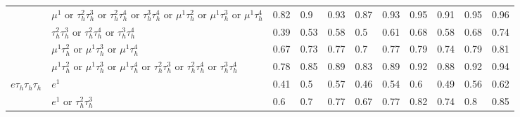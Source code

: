\begin{table}
{\begin{tabular}{|c|c|c||lllllllll}
\multicolumn{1}{|l|}{} & \multicolumn{2}{l||}{$\mu^{1}$ or $\tau_{h}^{2}\tau_{h}^{3}$ or $\tau_{h}^{2}\tau_{h}^{4}$ or $\tau_{h}^{3}\tau_{h}^{4}$ or $\mu^{1}\tau_{h}^{2}$ or $\mu^{1}\tau_{h}^{3}$ or $\mu^{1}\tau_{h}^{4}$} & \multicolumn{1}{l|}{0.82} & \multicolumn{1}{l|}{0.9} & \multicolumn{1}{l|}{0.93} & \multicolumn{1}{l|}{0.87} & \multicolumn{1}{l|}{0.93} & \multicolumn{1}{l|}{0.95} & \multicolumn{1}{l|}{0.91} & \multicolumn{1}{l|}{0.95} & \multicolumn{1}{l|}{0.96} \\
\multicolumn{1}{|l|}{} & \multicolumn{2}{l||}{$\tau_{h}^{2}\tau_{h}^{3}$ or $\tau_{h}^{2}\tau_{h}^{4}$ or $\tau_{h}^{3}\tau_{h}^{4}$} & \multicolumn{1}{l|}{0.39} & \multicolumn{1}{l|}{0.53} & \multicolumn{1}{l|}{0.58} & \multicolumn{1}{l|}{0.5} & \multicolumn{1}{l|}{0.61} & \multicolumn{1}{l|}{0.68} & \multicolumn{1}{l|}{0.58} & \multicolumn{1}{l|}{0.68} & \multicolumn{1}{l|}{0.74} \\
\multicolumn{1}{|l|}{} & \multicolumn{2}{l||}{$\mu^{1}\tau_{h}^{2}$ or $\mu^{1}\tau_{h}^{3}$ or $\mu^{1}\tau_{h}^{4}$} & \multicolumn{1}{l|}{0.67} & \multicolumn{1}{l|}{0.73} & \multicolumn{1}{l|}{0.77} & \multicolumn{1}{l|}{0.7} & \multicolumn{1}{l|}{0.77} & \multicolumn{1}{l|}{0.79} & \multicolumn{1}{l|}{0.74} & \multicolumn{1}{l|}{0.79} & \multicolumn{1}{l|}{0.81} \\
\multicolumn{1}{|l|}{} & \multicolumn{2}{l||}{$\mu^{1}\tau_{h}^{2}$ or $\mu^{1}\tau_{h}^{3}$ or $\mu^{1}\tau_{h}^{4}$ or $\tau_{h}^{2}\tau_{h}^{3}$ or $\tau_{h}^{2}\tau_{h}^{4}$ or $\tau_{h}^{3}\tau_{h}^{4}$} & \multicolumn{1}{l|}{0.78} & \multicolumn{1}{l|}{0.85} & \multicolumn{1}{l|}{0.89} & \multicolumn{1}{l|}{0.83} & \multicolumn{1}{l|}{0.89} & \multicolumn{1}{l|}{0.92} & \multicolumn{1}{l|}{0.88} & \multicolumn{1}{l|}{0.92} & \multicolumn{1}{l|}{0.94} \\
\hline
\multicolumn{1}{|l|}{$e\tau_{h}\tau_{h}\tau_{h}$} & \multicolumn{2}{l||}{$e^{1}$} & \multicolumn{1}{l|}{0.41} & \multicolumn{1}{l|}{0.5} & \multicolumn{1}{l|}{0.57} & \multicolumn{1}{l|}{0.46} & \multicolumn{1}{l|}{0.54} & \multicolumn{1}{l|}{0.6} & \multicolumn{1}{l|}{0.49} & \multicolumn{1}{l|}{0.56} & \multicolumn{1}{l|}{0.62} \\
\multicolumn{1}{|l|}{} & \multicolumn{2}{l||}{$e^{1}$ or $\tau_{h}^{2}\tau_{h}^{3}$} & \multicolumn{1}{l|}{0.6} & \multicolumn{1}{l|}{0.7} & \multicolumn{1}{l|}{0.77} & \multicolumn{1}{l|}{0.67} & \multicolumn{1}{l|}{0.77} & \multicolumn{1}{l|}{0.82} & \multicolumn{1}{l|}{0.74} & \multicolumn{1}{l|}{0.8} & \multicolumn{1}{l|}{0.85} \\

\end{tabular}}
\end{table}
